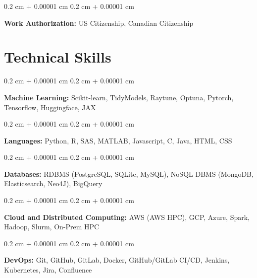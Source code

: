 \documentclass[10pt, letterpaper]{article}
\newenvironment{onecolentry}{
    \begin{adjustwidth}{
        0.2 cm + 0.00001 cm
    }{
        0.2 cm + 0.00001 cm
    }
}{
    \end{adjustwidth}
} %
\begin{document}
        \vspace{0.2 cm}

        \begin{onecolentry}
            \textbf{Work Authorization:} US Citizenship, Canadian Citizenship
        \end{onecolentry}


    
    \section{Technical Skills}



        
        \begin{onecolentry}
            \textbf{Machine Learning:} Scikit-learn, TidyModels, Raytune, Optuna, Pytorch, Tensorflow, Huggingface, JAX
        \end{onecolentry}

        \vspace{0.2 cm}

        \begin{onecolentry}
            \textbf{Languages:} Python, R, SAS, MATLAB, Javascript, C, Java, HTML, CSS
        \end{onecolentry}

        \vspace{0.2 cm}

        \begin{onecolentry}
            \textbf{Databases:} RDBMS (PostgreSQL, SQLite, MySQL), NoSQL DBMS (MongoDB, Elasticsearch, Neo4J), BigQuery
        \end{onecolentry}

        \vspace{0.2 cm}

        \begin{onecolentry}
            \textbf{Cloud and Distributed Computing:} AWS (AWS HPC), GCP, Azure, Spark, Hadoop, Slurm, On-Prem HPC
        \end{onecolentry}

        \vspace{0.2 cm}

        \begin{onecolentry}
            \textbf{DevOps:} Git, GitHub, GitLab, Docker, GitHub/GitLab CI/CD, Jenkins, Kubernetes, Jira, Confluence
        \end{onecolentry}

        \vspace{0.2 cm}
\end{document}
